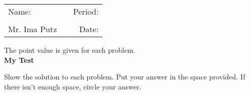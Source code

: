 \documentclass[a4paper,addpoints,12point]{exam}%
\newcommand{\assignment}{My Test}
\newcommand{\teacher}{Mr. Ima Putz}
\begin{document}
\fontsize{17pt}{20pt}\selectfont %
\noindent
\begin{tabular}{@{}l p{1.6in}r @{}}
Name: \vrule height 0 pt depth 0.4 pt width 3.0 in & & Period: \vrule height 0 pt depth 0.4 pt width .75 in \\\\
\teacher &  &Date: \hrulefill \\
\end{tabular}
\begin{center}
The point value is given for each problem.\\ \vspace{.1in}
	{\bf \assignment}
\end{center}
\noindent Show the solution to each problem. Put your answer in the space provided. If there isn't enough space, circle your answer.
\end{document}
